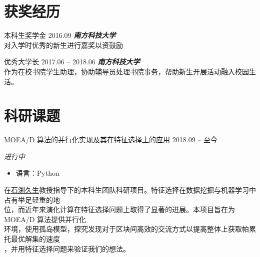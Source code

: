 \documentclass[hidelinks__VERSION__]{adamyi-cv}
\begin{document}

\section{\heir 获奖\heir 经历}

\begin{entrylist}


\entry
{\heir 本科生奖学金}
{2016.09}
{\hei \emph{\textbf{\hei 南方科技大学}}\\
对入学时优秀的新生进行嘉奖以资鼓励
}


\entry
{\heir 优秀大学长}
{2017.06 -- 2018.06}
{\hei \emph{\textbf{\hei 南方科技大学}}\\
作为在校书院学生助理，协助辅导员处理书院事务，帮助新生开展活动融入校园生活。
}


\end{entrylist}


\section{\heir 科研\heir 课题}

\begin{entrylist}


\entry
{\href{https://github.com/hackroid/pMOEA-D}{\heir MOEA/D 算法的并行化实现及其在特征选择上的应用}}
{2018.09 -- \hei 至今}
{\emph{\hei 进行中}
\begin{itemize}
    \item \hei 语言：Python
\end{itemize}
{\hei
在\href{http://cse.sustc.edu.cn/en/people/view/people_id/55/sort_id/9/pid/}{\hei 石渕久生}教授指导下的本科生团队科研项目。特征选择在数据挖掘与机器学习中占有举足轻重的地\\
位，而近年来演化计算在特征选择问题上取得了显著的进展。本项目旨在为 MOEA/D 算法提供并行化\\
环境，使用孤岛模型，探究发现对于区块间高效的交流方式以提高整体上获取帕累托最优解集的速度\\
，并用特征选择问题来验证我们的想法。
}}



\end{entrylist}
\end{document}
